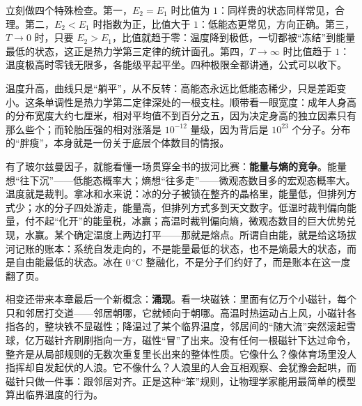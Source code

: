 立刻做四个特殊检查。第一，\(E_2=E_1\) 时比值为 \(1\)：同样贵的状态同样常见，合理。第二，\(E_2<E_1\) 时指数为正，比值大于 \(1\)：低能态更常见，方向正确。第三，\(T\to 0\) 时，只要 \(E_2>E_1\)，比值就趋于零：温度降到极低，一切都被“冻结”到能量最低的状态，这正是热力学第三定律的统计面孔。第四，\(T\to\infty\) 时比值趋于 \(1\)：温度极高时零钱无限多，各能级平起平坐。四种极限全都讲通，公式可以收下。

\begin{center}
\end{center}

温度升高，曲线只是“躺平”，从不反转：高能态永远比低能态稀少，只是差距变小。这条单调性是热力学第二定律深处的一根支柱。顺带看一眼宽度：成年人身高的分布宽度大约七厘米，相对平均值不到百分之五，因为决定身高的独立因素只有那么些个；而轮胎压强的相对涨落是 \(10^{-12}\) 量级，因为背后是 \(10^{23}\) 个分子。分布的“胖瘦”，本身就是一份关于底层个体数目的情报。

有了玻尔兹曼因子，就能看懂一场贯穿全书的拔河比赛：\textbf{能量与熵的竞争}。能量想“往下沉”——低能态概率大；熵想“往多走”——微观态数目多的宏观态概率大。温度就是裁判。拿冰和水来说：冰的分子被锁在整齐的晶格里，能量低，但排列方式少；水的分子四处游走，能量高，但排列方式多到天文数字。低温时裁判偏向能量，付不起“化开”的能量税，冰赢；高温时裁判偏向熵，微观态数目的巨大优势兑现，水赢。某个确定温度上两边打平——那就是熔点。所谓自由能，就是给这场拔河记账的账本：系统自发走向的，不是能量最低的状态，也不是熵最大的状态，而是自由能最低的状态。冰在 \(0\,^\circ\mathrm{C}\) 整融化，不是分子们约好了，而是账本在这一度翻了页。

相变还带来本章最后一个新概念：\textbf{涌现}。看一块磁铁：里面有亿万个小磁针，每个只和邻居打交道——邻居朝哪，它就倾向于朝哪。高温时热运动占上风，小磁针各指各的，整块铁不显磁性；降温过了某个临界温度，邻居间的“随大流”突然滚起雪球，亿万磁针齐刷刷指向一方，磁性“冒”了出来。没有任何一根磁针下达过命令，整齐是从局部规则的无数次重复里长出来的整体性质。它像什么？像体育场里没人指挥却自发起伏的人浪。它不像什么？人浪里的人会互相观察、会犹豫会起哄，而磁针只做一件事：跟邻居对齐。正是这种“笨”规则，让物理学家能用最简单的模型算出临界温度的行为。

